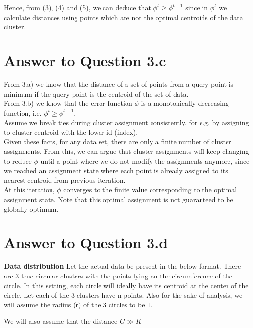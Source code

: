 \documentclass[11pt]{article}
\begin{document}
{Hence, from (3), (4) and (5), we can deduce that $\phi^t \geq \phi^{t+1}$ since in $\phi^t$ we calculate distances using points which are not the optimal centroids of the data cluster.


\pagebreak[4]
\section*{Answer to Question 3.c}

From 3.a) we know that the distance of a set of points from a query point is minimum if the query point is the centroid of the set of data. \\
From 3.b) we know that the error function $\phi$ is a monotonically decreasing function, i.e. $\phi^t \geq \phi^{t+1}$.\\
Assume we break ties during cluster assignment consistently, for e.g. by assigning to cluster centroid with the lower id (index). \\

Given these facts, for any data set, there are only a finite number of cluster assignments. From this, we can argue that cluster assignments will keep changing to reduce $\phi$ until a point where we do not modify the assignments anymore, since we reached an assignment state where each point is already assigned to its nearest centroid from previous iteration.\\

At this iteration, $\phi$ converges to the finite value corresponding to the optimal assignment state. Note that this optimal assignment is not guaranteed to be globally optimum.

\pagebreak[4]
\section*{Answer to Question 3.d}

\textbf{Data distribution}
Let the actual data be present in the below format. There are 3 true circular clusters with the points lying on the circumference of the circle. In this setting, each circle will ideally have its centroid at the center of the circle. Let each of the 3 clusters have n points. Also for the sake of analysis, we will assume the radius (r) of the 3 circles to be 1.

We will also assume that the distance $G \gg K$
\\

}
\end{document}
